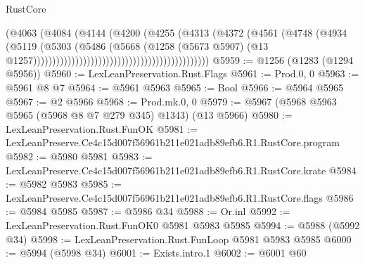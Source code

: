 \begin{lexlean}{RustCore}
\begin{coremodule}
                                                                (@4063
                                                                  (@4084
                                                                    (@4144
                                                                      (@4200
                                                                        (@4255
                                                                          (@4313
                                                                            (@4372
                                                                              (@4561
                                                                                (@4748
                                                                                  (@4934
                                                                                    (@5119
                                                                                      (@5303
                                                                                        (@5486
                                                                                          (@5668
                                                                                            (@1258
                                                                                              (@5673
                                                                                                @5907)
                                                                                              (@13
                                                                                                @1257))))))))))))))))))))))))))))))))))))))))))))))
@5959 := @1256 (@1283 (@1294 @5956))
@5960 := LexLeanPreservation.Rust.Flags
@5961 := Prod.{0, 0}
@5963 := @5961 @8 @7
@5964 := @5961 @5963
@5965 := Bool
@5966 := @5964 @5965
@5967 := @2 @5966
@5968 := Prod.mk.{0, 0}
@5979 := @5967 (@5968 @5963 @5965 (@5968 @8 @7 @279 @345) @1343) (@13 @5966)
@5980 := LexLeanPreservation.Rust.FunOK
@5981 := LexLeanPreserve.Ce4c15d007f56961b211e021adb89efb6.R1.RustCore.program
@5982 := @5980 @5981
@5983 := LexLeanPreserve.Ce4c15d007f56961b211e021adb89efb6.R1.RustCore.krate
@5984 := @5982 @5983
@5985 := LexLeanPreserve.Ce4c15d007f56961b211e021adb89efb6.R1.RustCore.flags
@5986 := @5984 @5985
@5987 := @5986 @34
@5988 := Or.inl
@5992 := LexLeanPreservation.Rust.FunOK0 @5981 @5983 @5985
@5994 := @5988 (@5992 @34)
@5998 := LexLeanPreservation.Rust.FunLoop @5981 @5983 @5985
@6000 := @5994 (@5998 @34)
@6001 := Exists.intro.{1}
@6002 := @6001 @60

\end{coremodule}
\end{lexlean}
